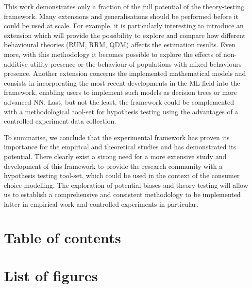 \documentclass[12pt,]{article}
\begin{document}
This work demonstrates only a fraction of the full potential of the
theory-testing framework. Many extensions and generalisations should be
performed before it could be used at scale. For example, it is
particularly interesting to introduce an extension which will provide
the possibility to explore and compare how different behavioural
theories (RUM, RRM, QDM) affects the estimation results. Even more, with
this methodology it becomes possible to explore the effects of
non-additive utility presence or the behaviour of populations with mixed
behaviours presence. Another extension concerns the implemented
mathematical models and consists in incorporating the most recent
developments in the ML field into the framework, enabling users to
implement such models as decision trees or more advanced NN. Last, but
not the least, the framework could be complemented with a methodological
tool-set for hypothesis testing using the advantages of a controlled
experiment data collection.

To summarise, we conclude that the experimental framework has proven its
importance for the empirical and theoretical studies and has
demonstrated its potential. There clearly exist a strong need for a more
extensive study and development of this framework to provide the
research community with a hypothesis testing tool-set, which could be
used in the context of the consumer choice modelling. The exploration of
potential biases and theory-testing will allow us to establish a
comprehensive and consistent methodology to be implemented latter in
empirical work and controlled experiments in particular.

\newpage
\renewcommand\contentsname{}
\setcounter{tocdepth}{4}

\hypertarget{table-of-contents}{%
\section*{Table of contents}\label{table-of-contents}}

\vspace{-12mm}
\tableofcontents

\newpage

\hypertarget{list-of-figures}{%
\section*{List of figures}\label{list-of-figures}}
\end{document}
